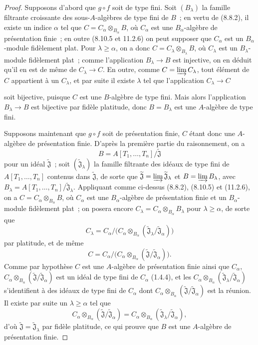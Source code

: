 \begin{proof}
Supposons d'abord que $g\circ f$ soit de type fini. Soit $(B_\lambda)$ la
famille filtrante croissante des sous-$A$-algèbres de type fini de $B$~; en
vertu de (8.8.2), il existe un indice $\alpha$ tel que
$C=C_\alpha\otimes_{B_\alpha}B$, où $C_\alpha$ est une
$B_\alpha$-algèbre de présentation finie~; en outre (8.10.5 et 11.2.6) on peut
supposer que $C_\alpha$ est un $B_\alpha$-module fidèlement plat. Pour
$\lambda\geq\alpha$, on a donc
$C=C_\lambda\otimes_{B_\lambda}B$, où $C_\lambda$ est un
$B_\lambda$-module fidèlement plat~; comme l'application $B_\lambda\to B$ est
injective, on en déduit qu'il en est de même de $C_\lambda\to C$. En outre,
comme $C=\varinjlim C_\lambda$, tout élément de $C$ appartient à un
$C_\lambda$, et par suite il existe $\lambda$ tel que l'application
$C_\lambda\to C$


soit bijective, puisque $C$ est une $B$-algèbre de type fini. Mais alors
l'application $B_\lambda\to B$ est bijective par fidèle platitude, donc
$B=B_\lambda$ est une $A$-algèbre de type fini.

Supposons maintenant que $g\circ f$ soit de présentation finie, $C$ étant donc
une $A$-algèbre de présentation finie. D'après la première partie du
raisonnement, on a
\[
B=A[T_1,\ldots,T_n]/\widetilde{\mathfrak J}
\]
pour un idéal $\widetilde{\mathfrak J}$~; soit
$(\widetilde{\mathfrak J}_\lambda)$ la famille filtrante des idéaux de type
fini de $A[T_1,\ldots,T_n]$ contenus dans $\widetilde{\mathfrak J}$, de sorte
que $\widetilde{\mathfrak J}=\varinjlim\widetilde{\mathfrak J}_\lambda$ et
$B=\varinjlim B_\lambda$, avec
$B_\lambda=A[T_1,\ldots,T_n]/\widetilde{\mathfrak J}_\lambda$. Appliquant
comme ci-dessus (8.8.2), (8.10.5) et (11.2.6), on a
$C=C_\alpha\otimes_{B_\alpha}B$, où $C_\alpha$ est une
$B_\alpha$-algèbre de présentation finie et un $B_\alpha$-module fidèlement
plat~; on posera encore $C_\lambda=C_\alpha\otimes_{B_\alpha}B_\lambda$ pour
$\lambda\geq\alpha$, de sorte que
\[
C_\lambda=C_\alpha/\big(C_\alpha\otimes_{B_\alpha}
(\widetilde{\mathfrak J}_\lambda/\widetilde{\mathfrak J}_\alpha)\big)
\]
par platitude, et de même
\[
C=C_\alpha/\big(C_\alpha\otimes_{B_\alpha}
(\widetilde{\mathfrak J}/\widetilde{\mathfrak J}_\alpha)\big).
\]
Comme par hypothèse $C$ est une $A$-algèbre de présentation finie ainsi que
$C_\alpha$, $C_\alpha\otimes_{B_\alpha}
(\widetilde{\mathfrak J}/\widetilde{\mathfrak J}_\alpha)$ est un idéal de
type fini de $C_\alpha$ (1.4.4), et les
$C_\alpha\otimes_{B_\alpha}
(\widetilde{\mathfrak J}_\lambda/\widetilde{\mathfrak J}_\alpha)$
s'identifient à des idéaux de type fini de $C_\alpha$ dont
$C_\alpha\otimes_{B_\alpha}
(\widetilde{\mathfrak J}/\widetilde{\mathfrak J}_\alpha)$ est la réunion. Il
existe par suite un $\lambda\geq\alpha$ tel que
\[
C_\alpha\otimes_{B_\alpha}
(\widetilde{\mathfrak J}/\widetilde{\mathfrak J}_\alpha)
=C_\alpha\otimes_{B_\alpha}
(\widetilde{\mathfrak J}_\lambda/\widetilde{\mathfrak J}_\alpha),
\]
d'où $\widetilde{\mathfrak J}=\widetilde{\mathfrak J}_\lambda$ par fidèle
platitude, ce qui prouve que $B$ est une $A$-algèbre de présentation finie.
\end{proof}

